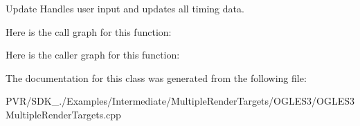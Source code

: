   Update  Handles user input and updates all timing data. 

Here is the call graph for this function\+:




Here is the caller graph for this function\+:




The documentation for this class was generated from the following file\+:\begin{DoxyCompactItemize}
\item 
P\+V\+R/\+S\+D\+K\+\_./\+Examples/\+Intermediate/\+Multiple\+Render\+Targets/\+O\+G\+L\+E\+S3/O\+G\+L\+E\+S3\+Multiple\+Render\+Targets.\+cpp\end{DoxyCompactItemize}
